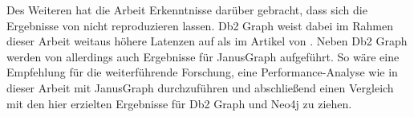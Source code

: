 Des Weiteren hat die Arbeit Erkenntnisse darüber gebracht, dass sich die Ergebnisse von  nicht reproduzieren lassen. Db2 Graph weist dabei im Rahmen dieser Arbeit weitaus höhere Latenzen auf als im Artikel von . Neben Db2 Graph werden von  allerdings auch Ergebnisse für JanusGraph aufgeführt. So wäre eine Empfehlung für die weiterführende Forschung, eine Performance-Analyse wie in dieser Arbeit mit JanusGraph durchzuführen und abschließend einen Vergleich mit den hier erzielten Ergebnisse für Db2 Graph und Neo4j zu ziehen.